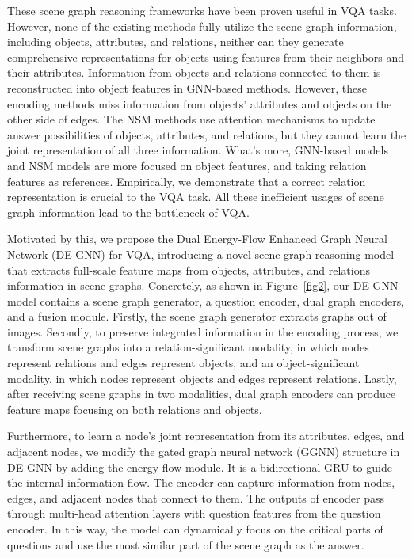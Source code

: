 \documentclass[letterpaper]{article} %
\begin{document}
These scene graph reasoning frameworks have been proven useful in VQA tasks. However, none of the existing methods fully utilize the scene graph information, including objects, attributes, and relations, neither can they generate comprehensive representations for objects using features from their neighbors and their attributes. Information from objects and relations connected to them is reconstructed into object features in GNN-based methods. However, these encoding methods miss information from objects' attributes and objects on the other side of edges. The NSM methods use attention mechanisms to update answer possibilities of objects, attributes, and relations, but they cannot learn the joint representation of all three information. What's more, GNN-based models and NSM models are more focused on object features, and taking relation features as references. Empirically, we demonstrate that a correct relation representation is crucial to the VQA task. All these inefficient usages of scene graph information lead to the bottleneck of VQA.

Motivated by this, we propose the Dual Energy-Flow Enhanced Graph Neural Network (DE-GNN) for VQA, introducing a novel scene graph reasoning model that extracts full-scale feature maps from objects, attributes, and relations information in scene graphs. Concretely, as shown in Figure~\ref{fig2}, our DE-GNN model contains a scene graph generator, a question encoder, dual graph encoders, and a fusion module. Firstly, the scene graph generator extracts graphs out of images. Secondly, to preserve integrated information in the encoding process, we transform scene graphs into a relation-significant modality, in which nodes represent relations and edges represent objects, and an object-significant modality, in which nodes represent objects and edges represent relations. Lastly, after receiving scene graphs in two modalities, dual graph encoders can produce feature maps focusing on both relations and objects.

Furthermore, to learn a node's joint representation from its attributes, edges, and adjacent nodes, we modify the gated graph neural network (GGNN) structure in DE-GNN by adding the energy-flow module. It is a  bidirectional GRU to guide the internal information flow.
The encoder can capture information from nodes, edges, and adjacent nodes that connect to them. The outputs of encoder pass through multi-head attention layers with question features from the question encoder. In this way, the model can dynamically focus on the critical parts of questions and use the most similar part of the scene graph as the answer.
\end{document}
